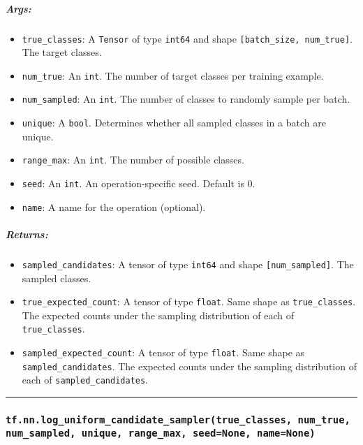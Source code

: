 \subparagraph{Args: }\label{args-25}

\begin{itemize}
\tightlist
\item
  \texttt{true\_classes}: A \texttt{Tensor} of type \texttt{int64} and
  shape \texttt{{[}batch\_size,\ num\_true{]}}. The target classes.
\item
  \texttt{num\_true}: An \texttt{int}. The number of target classes per
  training example.
\item
  \texttt{num\_sampled}: An \texttt{int}. The number of classes to
  randomly sample per batch.
\item
  \texttt{unique}: A \texttt{bool}. Determines whether all sampled
  classes in a batch are unique.
\item
  \texttt{range\_max}: An \texttt{int}. The number of possible classes.
\item
  \texttt{seed}: An \texttt{int}. An operation-specific seed. Default is
  0.
\item
  \texttt{name}: A name for the operation (optional).
\end{itemize}

\subparagraph{Returns: }\label{returns-25}

\begin{itemize}
\tightlist
\item
  \texttt{sampled\_candidates}: A tensor of type \texttt{int64} and
  shape \texttt{{[}num\_sampled{]}}. The sampled classes.
\item
  \texttt{true\_expected\_count}: A tensor of type \texttt{float}. Same
  shape as \texttt{true\_classes}. The expected counts under the
  sampling distribution of each of \texttt{true\_classes}.
\item
  \texttt{sampled\_expected\_count}: A tensor of type \texttt{float}.
  Same shape as \texttt{sampled\_candidates}. The expected counts under
  the sampling distribution of each of \texttt{sampled\_candidates}.
\end{itemize}

\begin{center}\rule{0.5\linewidth}{\linethickness}\end{center}

\subsubsection{\texorpdfstring{\texttt{tf.nn.log\_uniform\_candidate\_sampler(true\_classes,\ num\_true,\ num\_sampled,\ unique,\ range\_max,\ seed=None,\ name=None)}
}{tf.nn.log\_uniform\_candidate\_sampler(true\_classes, num\_true, num\_sampled, unique, range\_max, seed=None, name=None) }}\label{tf.nn.logux5funiformux5fcandidateux5fsamplertrueux5fclasses-numux5ftrue-numux5fsampled-unique-rangeux5fmax-seednone-namenone}


